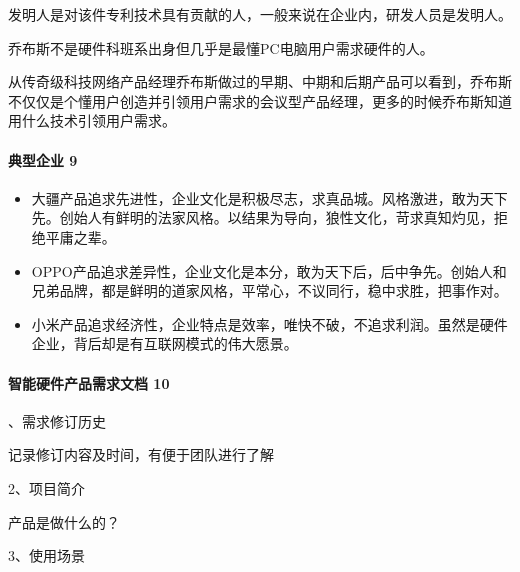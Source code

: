 \documentclass[letterpaper,11pt,english]{sphinxmanual}
\begin{document}
发明人是对该件专利技术具有贡献的人，一般来说在企业内，研发人员是发明人。

乔布斯不是硬件科班系出身但几乎是最懂PC电脑用户需求硬件的人。


从传奇级科技网络产品经理乔布斯做过的早期、中期和后期产品可以看到，乔布斯不仅仅是个懂用户创造并引领用户需求的会议型产品经理，更多的时候乔布斯知道用什么技术引领用户需求。


\paragraph{典型企业 9\sphinxfootnotemark[719]}
\label{\detokenize{chapter_project/AI_hardware:id29}}%
\begin{footnotetext}[719]\sphinxAtStartFootnote
{}
%
\end{footnotetext}\ignorespaces \begin{itemize}
\item {} 
大疆产品追求先进性，企业文化是积极尽志，求真品城。风格激进，敢为天下先。创始人有鲜明的法家风格。以结果为导向，狼性文化，苛求真知灼见，拒绝平庸之辈。

\item {} 
OPPO产品追求差异性，企业文化是本分，敢为天下后，后中争先。创始人和兄弟品牌，都是鲜明的道家风格，平常心，不议同行，稳中求胜，把事作对。

\item {} 
小米产品追求经济性，企业特点是效率，唯快不破，不追求利润。虽然是硬件企业，背后却是有互联网模式的伟大愿景。

\end{itemize}


\paragraph{智能硬件产品需求文档 10\sphinxfootnotemark[720]}
\label{\detokenize{chapter_project/AI_hardware:id30}}%
\begin{footnotetext}[720]\sphinxAtStartFootnote
{}
%
\end{footnotetext}、需求修订历史

记录修订内容及时间，有便于团队进行了解

2、项目简介

产品是做什么的？

3、使用场景
\end{document}
